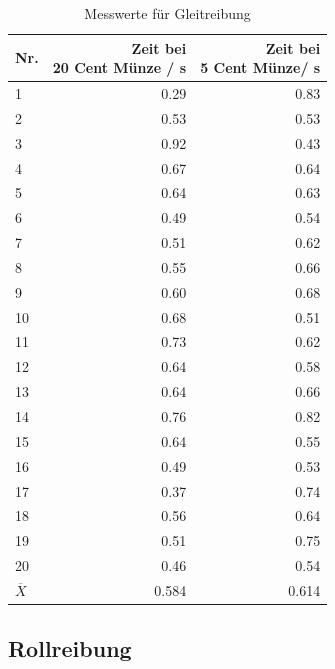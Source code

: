 \documentclass{article}
\begin{document}
\begin{table}[H]
\caption{Messwerte für Gleitreibung}
\begin{tabular}{l|rr}
Nr. & \shortstack[l]{Zeit bei\\ 20 Cent Münze / s} & \shortstack[l]{Zeit bei \\ 5 Cent Münze/ s} \\
\hline
1 & 0.29 & 0.83 \\
2 & 0.53 & 0.53 \\
3 & 0.92 & 0.43 \\
4 & 0.67 & 0.64 \\
5 & 0.64 & 0.63 \\
6 & 0.49 & 0.54\\
7 & 0.51 & 0.62\\
8 & 0.55 & 0.66\\
9 & 0.60 & 0.68\\
10 & 0.68 & 0.51\\
11 & 0.73 & 0.62\\
12 & 0.64 & 0.58\\
13 & 0.64 & 0.66\\
14 & 0.76 & 0.82\\
15 & 0.64 & 0.55\\
16 & 0.49 & 0.53\\
17 & 0.37 & 0.74\\
18 & 0.56 & 0.64\\
19 & 0.51 & 0.75\\
20 & 0.46 & 0.54\\
\hline 
$\overline{X}$ & 0.584 & 0.614
\end{tabular}
\end{table}







\subsection{Rollreibung}
\end{document}
